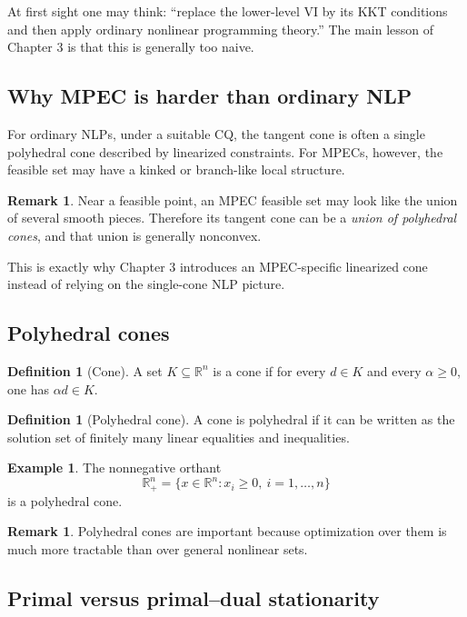 \documentclass[pdflatex,sn-mathphys-num]{sn-jnl}%
\theoremstyle{definition}
\newtheorem{definition}[theorem]{Definition}
\newtheorem{remark}[theorem]{Remark}
\newtheorem{example}[theorem]{Example}
\begin{document}
At first sight one may think: ``replace the lower-level VI by its KKT
conditions and then apply ordinary nonlinear programming theory.'' The
main lesson of Chapter 3 is that this is generally too naive.

\subsection{Why MPEC is harder than ordinary NLP}

For ordinary NLPs, under a suitable CQ, the tangent cone is often a single
polyhedral cone described by linearized constraints. For MPECs, however,
the feasible set may have a kinked or branch-like local structure.

\begin{remark}
Near a feasible point, an MPEC feasible set may look like the union of
several smooth pieces. Therefore its tangent cone can be a \emph{union of
polyhedral cones}, and that union is generally nonconvex.
\end{remark}

This is exactly why Chapter 3 introduces an MPEC-specific linearized cone
instead of relying on the single-cone NLP picture.

\subsection{Polyhedral cones}

\begin{definition}[Cone]
A set $K\subseteq\mathbb{R}^n$ is a cone if for every $d\in K$ and every
$\alpha\ge 0$, one has $\alpha d\in K$.
\end{definition}

\begin{definition}[Polyhedral cone]
A cone is polyhedral if it can be written as the solution set of finitely many
linear equalities and inequalities.
\end{definition}

\begin{example}
The nonnegative orthant
\[
\mathbb{R}^n_+ = \{x\in\mathbb{R}^n:x_i\ge 0,\ i=1,\dots,n\}
\]
is a polyhedral cone.
\end{example}

\begin{remark}
Polyhedral cones are important because optimization over them is much more
tractable than over general nonlinear sets.
\end{remark}

\subsection{Primal versus primal--dual stationarity}
\end{document}
